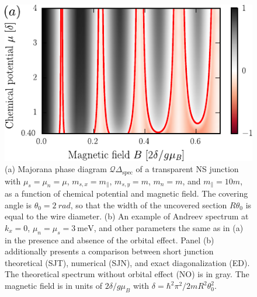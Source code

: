 \begin{figure}
\begin{center}
\includegraphics[width=0.7\columnwidth]{chapter_shortjunction/figures/gaps_orb}
\caption{(a) Majorana phase diagram $\mathcal{Q} \Delta_\textrm{spec}$ of a transparent NS junction with $\mu_s=\mu_n=\mu$, $m_{s,x}=m_\parallel$, $m_{s,y}=m$, $m_n=m$, and $m_\parallel=10 m$, as a function of chemical potential and magnetic field.
The covering angle is $\theta_0 = \SI{2}{rad}$, so that the width of the uncovered section $R\theta_0$ is equal to the wire diameter.
(b) An example of Andreev spectrum at $k_x=0$, $\mu_n=\mu_s=\SI{3}{\meV}$, and other parameters the same as in (a) in the presence and absence of the orbital effect.
Panel (b) additionally presents a comparison between short junction theoretical (SJT), numerical (SJN), and exact diagonalization (ED).
The theoretical spectrum without orbital effect (NO) is in gray.
The magnetic field is in units of $2\delta/g\mu_B$ with $\delta=\hbar^2\pi^2/2mR^2\theta_0^2$.}
\label{fig:gaps_orb}
\end{center}
\end{figure}

